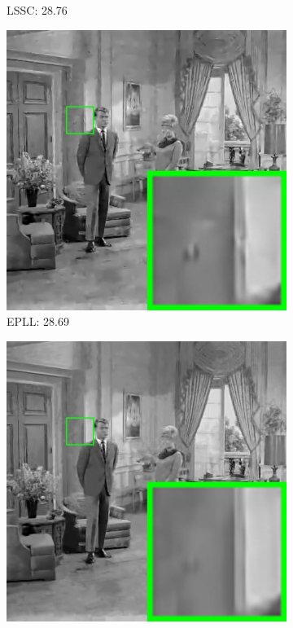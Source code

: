 \begin{figure}
\begin{subfigure}[t]{0.24\textwidth}
		\caption{LSSC: 28.76}
    \end{subfigure}
    \hfill
    \begin{subfigure}[t]{0.24\textwidth}
        \centering
        \includegraphics[width=1\textwidth]{images/pgpd/br_EPLL_30_couple.jpg}
		\caption{EPLL: 28.69}
    \end{subfigure}
    \hfill
    \begin{subfigure}[t]{0.24\textwidth}
        \centering
        \includegraphics[width=1\textwidth]{images/pgpd/br_NCSR_30_couple.jpg}

\end{subfigure}
\end{figure}
